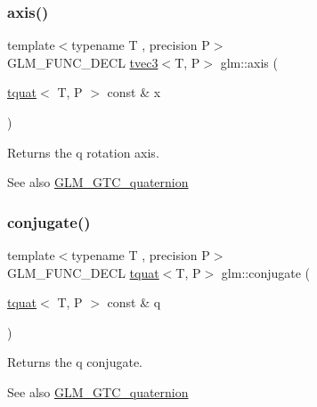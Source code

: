 \subsubsection{\texorpdfstring{axis()}{axis()}}
{\footnotesize\ttfamily template$<$typename T , precision P$>$ \\
G\+L\+M\+\_\+\+F\+U\+N\+C\+\_\+\+D\+E\+CL \hyperlink{structglm_1_1tvec3}{tvec3}$<$T, P$>$ glm\+::axis (\begin{DoxyParamCaption}\item[{\hyperlink{structglm_1_1tquat}{tquat}$<$ T, P $>$ const \&}]{x }\end{DoxyParamCaption})}

Returns the q rotation axis.

\begin{DoxySeeAlso}{See also}
\hyperlink{group__gtc__quaternion}{G\+L\+M\+\_\+\+G\+T\+C\+\_\+quaternion} 
\end{DoxySeeAlso}
\mbox{\label{group__gtc__quaternion_gab1ace864fbf189ffa368950001808a3c}} 
\subsubsection{\texorpdfstring{conjugate()}{conjugate()}}
{\footnotesize\ttfamily template$<$typename T , precision P$>$ \\
G\+L\+M\+\_\+\+F\+U\+N\+C\+\_\+\+D\+E\+CL \hyperlink{structglm_1_1tquat}{tquat}$<$T, P$>$ glm\+::conjugate (\begin{DoxyParamCaption}\item[{\hyperlink{structglm_1_1tquat}{tquat}$<$ T, P $>$ const \&}]{q }\end{DoxyParamCaption})}

Returns the q conjugate.

\begin{DoxySeeAlso}{See also}
\hyperlink{group__gtc__quaternion}{G\+L\+M\+\_\+\+G\+T\+C\+\_\+quaternion} 
\end{DoxySeeAlso}
\mbox{\label{group__gtc__quaternion_gac54dfc83de465a2d03e90d342242ab3d}} 
